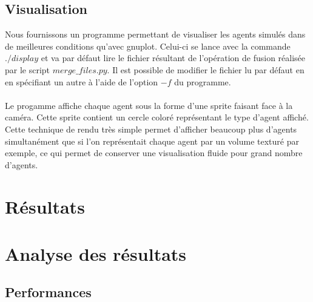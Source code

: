 \documentclass[12pt,a4paper,sans]{article}
\begin{document}
\subsection{Visualisation}
Nous fournissons un programme permettant de visualiser les agents simulés dans de meilleures conditions qu'avec gnuplot.
Celui-ci se lance avec la commande $./display$ et va par défaut lire le fichier résultant de l'opération de fusion réalisée par le script $merge\_files.py$. Il est possible de modifier le fichier lu par défaut en en spécifiant un autre à l'aide de l'option $-f$ du programme.\\\\
Le progamme affiche chaque agent sous la forme d'une sprite faisant face à la caméra. Cette sprite contient un cercle coloré représentant le type d'agent affiché. Cette technique de rendu très simple permet d'afficher beaucoup plus d'agents simultanément que si l'on représentait chaque agent par un volume texturé par exemple, ce qui permet de conserver une visualisation fluide pour grand nombre d'agents.



\section{Résultats}




\section{Analyse des résultats}

\subsection{Performances}
\end{document}
